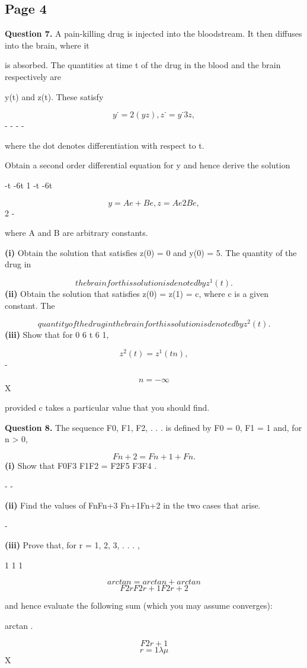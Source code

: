 \documentclass[12pt]{article}
\begin{document}
\subsection*{Page 4}
\begin{flushleft}
\bigskip\textbf{Question 7.} A pain-killing drug is injected into the bloodstream. It then diffuses into the brain, where it\par
is absorbed. The quantities at time t of the drug in the blood and the brain respectively are\par
y(t) and z(t). These satisfy\par
\[y˙ = 2(y z) , z˙ = y˙ 3z ,\]
- - - -\par
where the dot denotes differentiation with respect to t.\par
Obtain a second order differential equation for y and hence derive the solution\par
-t -6t 1 -t -6t\par
\[y = Ae + Be , z = Ae 2Be ,\]
2 -\par
where A and B are arbitrary constants.\par
\textbf{(i)} Obtain the solution that satisfies z(0) = 0 and y(0) = 5. The quantity of the drug in\par
\[the brain for this solution is denoted by z^1(t).\]
\textbf{(ii)} Obtain the solution that satisfies z(0) = z(1) = c, where c is a given constant. The\par
\[quantity of the drug in the brain for this solution is denoted by z^2(t).\]
\textbf{(iii)} Show that for 0 6 t 6 1,\par
\[z^2(t) = z^1(t n) ,\]
-\par
\[n=-\infty\]
X\par
provided c takes a particular value that you should find.\par
\bigskip\textbf{Question 8.} The sequence F0, F1, F2, . . . is defined by F0 = 0, F1 = 1 and, for n > 0,\par
\[Fn+2 = Fn+1 + Fn .\]
\textbf{(i)} Show that F0F3 F1F2 = F2F5 F3F4 .\par
- -\par
\textbf{(ii)} Find the values of FnFn+3 Fn+1Fn+2 in the two cases that arise.\par
-\par
\textbf{(iii)} Prove that, for r = 1, 2, 3, . . . ,\par
1 1 1\par
\[arctan = arctan + arctan\]
\[F2r F2r+1 F2r+2\]
\lambda \mu \lambda \mu \lambda \mu\par
and hence evaluate the following sum (which you may assume converges):\par
\infty\par
arctan .\par
\[F2r+1\]
\[r=1 \lambda \mu\]
X\par
\end{flushleft}
\end{document}
